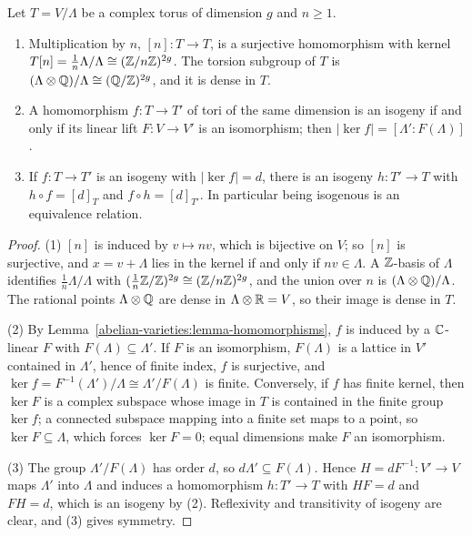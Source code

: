 \begin{proposition}\label{abelian-varieties:proposition-torsion}
Let $T = V/\Lambda$ be a complex torus of dimension $g$ and $n \geq 1$.
\begin{enumerate}
\item Multiplication by $n$, $[n] \colon T \to T$, is a surjective homomorphism with kernel $T[n] = \frac1n\Lambda/\Lambda \cong (\mathbb{Z}/n\mathbb{Z})^{2g}$. The torsion subgroup of $T$ is $(\Lambda \otimes \mathbb{Q})/\Lambda \cong (\mathbb{Q}/\mathbb{Z})^{2g}$, and it is
dense in $T$.
\item A homomorphism $f \colon T \to T'$ of tori of the same dimension is an isogeny if and only if its linear lift $F \colon V \to V'$ is an isomorphism; then $|\ker f| = [\Lambda' : F(\Lambda)]$.
\item If $f \colon T \to T'$ is an isogeny with $|\ker f| = d$, there is an isogeny $h \colon T' \to T$ with $h \circ f = [d]_T$ and $f \circ h = [d]_{T'}$. In particular being isogenous is an equivalence relation.
\end{enumerate}
\end{proposition}

\begin{proof}
(1) $[n]$ is induced by $v \mapsto nv$, which is bijective on $V$; so $[n]$ is surjective, and $x = v + \Lambda$ lies in the kernel if and only if $nv \in \Lambda$. A $\mathbb{Z}$-basis of $\Lambda$ identifies
$\frac1n\Lambda/\Lambda$ with $(\frac1n\mathbb{Z}/\mathbb{Z})^{2g} \cong (\mathbb{Z}/n\mathbb{Z})^{2g}$, and the union over $n$ is $(\Lambda \otimes \mathbb{Q})/\Lambda$. The rational points $\Lambda \otimes \mathbb{Q}$ are dense in $\Lambda \otimes \mathbb{R} = V$, so
their image is dense in $T$.

(2) By Lemma~\ref{abelian-varieties:lemma-homomorphisms}, $f$ is induced by a $\mathbb{C}$-linear $F$ with $F(\Lambda) \subseteq \Lambda'$. If $F$ is an isomorphism, $F(\Lambda)$ is a lattice in $V'$ contained in $\Lambda'$, hence of
finite index, $f$ is surjective, and $\ker f = F^{-1}(\Lambda')/\Lambda \cong \Lambda'/F(\Lambda)$ is finite. Conversely, if $f$ has finite kernel, then $\ker F$ is a complex subspace whose image in $T$ is contained in the
finite group $\ker f$; a connected subspace mapping into a finite set maps to a point, so $\ker F \subseteq \Lambda$, which forces $\ker F = 0$; equal dimensions make $F$ an isomorphism.

(3) The group $\Lambda'/F(\Lambda)$ has order $d$, so $d\Lambda' \subseteq F(\Lambda)$. Hence $H = dF^{-1} \colon V' \to V$ maps $\Lambda'$ into $\Lambda$ and induces a homomorphism $h \colon T' \to T$ with
$HF = d$ and $FH = d$, which is an isogeny by (2). Reflexivity and transitivity of isogeny are clear, and (3) gives symmetry.
\end{proof}

